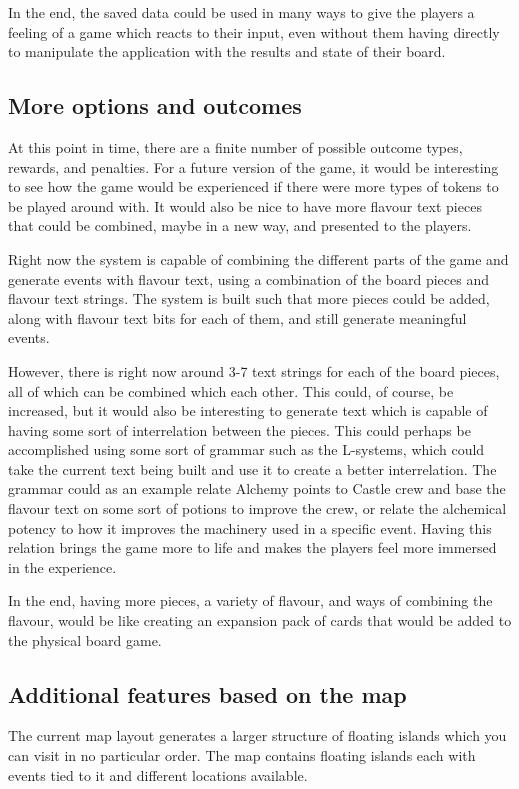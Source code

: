 In the end, the saved data could be used in many ways to give the players a feeling of a game which reacts to their input, even without them having directly to manipulate the application with the results and state of their board.

\subsection{More options and outcomes}
At this point in time, there are a finite number of possible outcome types, rewards, and penalties. For a future version of the game, it would be interesting to see how the game would be experienced if there were more types of tokens to be played around with. It would also be nice to have more flavour text pieces that could be combined, maybe in a new way, and presented to the players. 

Right now the system is capable of combining the different parts of the game and generate events with flavour text, using a combination of the board pieces and flavour text strings.
The system is built such that more pieces could be added, along with flavour text bits for each of them, and still generate meaningful events. 

However, there is right now around 3-7 text strings for each of the board pieces, all of which can be combined which each other. This could, of course, be increased, but it would also be interesting to generate text which is capable of having some sort of interrelation between the pieces. 
This could perhaps be accomplished using some sort of grammar such as the L-systems, which could take the current text being built and use it to create a better interrelation. 
The grammar could as an example relate Alchemy points to Castle crew and base the flavour text on some sort of potions to improve the crew, or relate the alchemical potency to how it improves the machinery used in a specific event. 
Having this relation brings the game more to life and makes the players feel more immersed in the experience.

In the end, having more pieces, a variety of flavour, and ways of combining the flavour, would be like creating an expansion pack of cards that would be added to the physical board game.

\subsection{Additional features based on the map}
The current map layout generates a larger structure of floating islands which you can visit in no particular order. The map contains floating islands each with events tied to it and different locations available.


